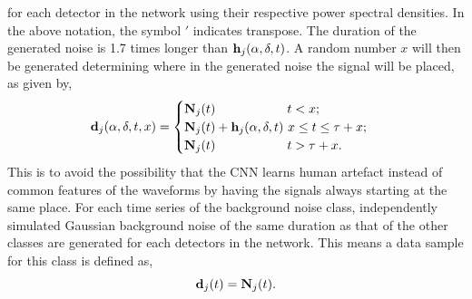 \documentclass[aps,twocolumn,showpacs,groupedaddress, nofootinbib]{revtex4}  %
\begin{document}
for each detector in the network using their respective power spectral densities.  
In the above notation, the symbol $'$ indicates transpose. 
The duration of the generated noise is 1.7 times longer than $ \bold{h}_j(\alpha, \delta, t)$. 
A random number $x$ will then be generated determining where in the generated noise the signal will be placed, as given by,
\begin{equation}
\bold{d}_j(\alpha, \delta, t, x)=
\begin{cases}
\bold{N}_j(t)~~~~~~~~~~~~~~~~~t < x; \\
\bold{N}_j(t) + \bold{h}_j(\alpha, \delta, t)~x \leq t \leq \tau + x; \\
\bold{N}_j(t)~~~~~~~~~~~~~~~~~t > \tau + x. \\
\end{cases}
\end{equation}
This is to avoid the possibility that the \ac{CNN} learns human artefact instead of common features of the waveforms by having the signals always starting at the same place.
For each time series of the background noise class, independently simulated Gaussian background noise of the same duration as that of the other classes 
are generated for each detectors in the network.
This means a data sample for this class is defined as,
\begin{equation}\label{eq:noise}
 \bold{d}_j(t) = \bold{N}_j(t).
\end{equation}
\end{document}
